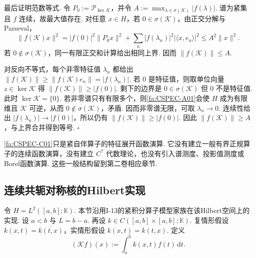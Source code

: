 \begin{FAProof}
最后证明范数等式. 令 \(\displaystyle P_0:=\mathcal P_{\ker\mathcal K}\)，并令 \(\displaystyle A:=\max_{\lambda\in\sigma(\mathcal K)}|f(\lambda)|\).
谱为紧集且 \(\displaystyle f\) 连续，故最大值存在. 对任意 \(\displaystyle x\in H\)，若 \(\displaystyle0\in\sigma(\mathcal K)\)，由正交分解与Parseval，
\[
\|f(\mathcal K)x\|^2 = |f(0)|^2\|P_0x\|^2 + \sum_n|f(\lambda_n)|^2|\langle x,e_n\rangle|^2 \leqslant A^2\|x\|^2.
\]
若 \(\displaystyle0\notin\sigma(\mathcal K)\)，同一有限正交和计算给出相同上界. 因而 \(\displaystyle \|f(\mathcal K)\|\leqslant A\).

对反向不等式，每个非零特征值 \(\displaystyle \lambda_n\) 都给出
\(\displaystyle \|f(\mathcal K)\| \geqslant \|f(\mathcal K)e_n\| = |f(\lambda_n)|\).
若 \(\displaystyle0\) 是特征值，则取单位向量 \(\displaystyle z\in\ker\mathcal K\) 得 \(\displaystyle \|f(\mathcal K)\|\geqslant|f(0)|\). 剩下的边界是 \(\displaystyle0\in\sigma(\mathcal K)\) 但 \(\displaystyle0\) 不是特征值. 此时 \(\displaystyle \ker\mathcal K=\{0\}\). 若非零谱只有有限多个，则\autoref{fa:CSPEC-A01}会使 \(\displaystyle H\) 成为有限维且 \(\displaystyle \mathcal K\) 可逆，从而 \(\displaystyle0\notin\sigma(\mathcal K)\)，矛盾. 因而非零谱无限，可取 \(\displaystyle \lambda_n\to0\). 连续性给出 \(\displaystyle |f(\lambda_n)|\to|f(0)|\)，所以仍有 \(\displaystyle \|f(\mathcal K)\|\geqslant|f(0)|\). 因此 \(\displaystyle \|f(\mathcal K)\|\geqslant A\)，与上界合并得到等号.
\hfill\(\square\)
\end{FAProof}

\begin{FARemark}[函数演算边界]
\autoref{fa:CSPEC-C01}只是紧自伴算子的特征展开函数演算. 它没有建立一般有界正规算子的连续函数演算，没有建立 \(\displaystyle C^*\) 代数理论，也没有引入谱测度、投影值测度或Borel函数演算. 这些一般结构留到第二卷相应章节.
\end{FARemark}

\subsection{连续共轭对称核的Hilbert实现}

令 \(\displaystyle H=L^2([a,b];\mathbb K)\). 本节沿用I-13的紧积分算子模型家族在该Hilbert空间上的实现. 设 \(\displaystyle a<b\) 与 \(\displaystyle L=b-a\). 再设
\(\displaystyle k \in C([a,b]\times[a,b];\mathbb K)\).
复情形假设 \(\displaystyle k(x,t)=\overline{k(t,x)}\)，实情形假设 \(\displaystyle k(x,t)=k(t,x)\). 定义
\[
(\mathcal Kf)(x)
:=
\int_a^b k(x,t)f(t)\,\mathrm{d}t.
\]

